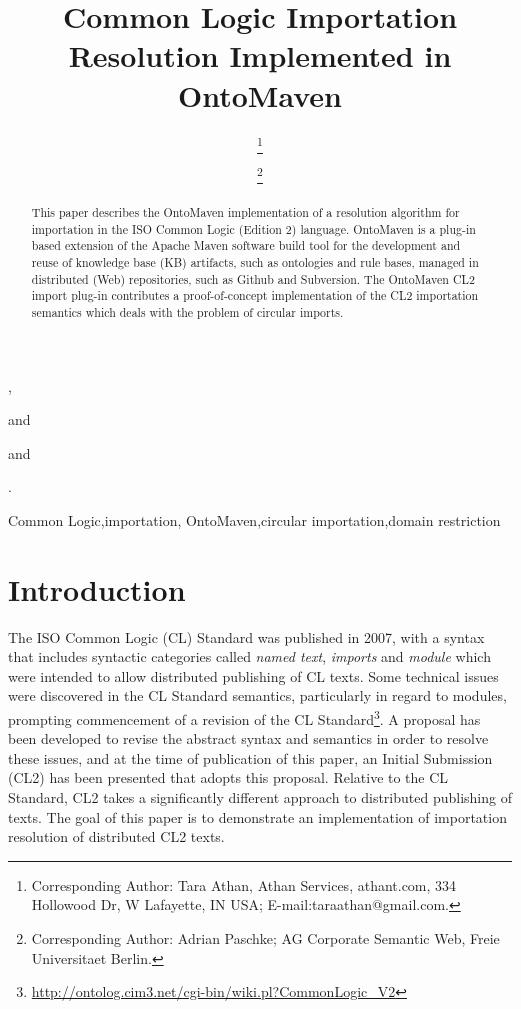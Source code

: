 \documentclass{IOS-Book-Article}
\begin{document}
\newtheorem{theo}{Theorem}
\newtheorem{cor}{Corollary}
\newtheorem{lem}{Lemma}
\begin{frontmatter}              %

\title{Common Logic Importation Resolution Implemented in OntoMaven}

\author[A]{ },%
\author[B]{ 
\thanks{Corresponding Author: Tara Athan, Athan Services, athant.com, 334 Hollowood Dr, W Lafayette, IN USA; E-mail:taraathan@gmail.com.}}
and
\author[A]{ 
\thanks{Corresponding Author: Adrian Paschke; AG Corporate Semantic Web, Freie Universitaet Berlin.}}
\address[A]{Freie Universitaet Berlin, Germany} and
\address[B]{Athan Services, USA}.

\begin{abstract}
This paper describes the OntoMaven implementation of a resolution algorithm for importation in the ISO Common Logic (Edition 2) language. OntoMaven is a plug-in based extension of the Apache Maven software build tool for the development and reuse of knowledge base (KB) artifacts, such as ontologies and rule bases, managed in distributed (Web) repositories, such as Github and Subversion. The OntoMaven CL2 import plug-in contributes a proof-of-concept implementation of the CL2 importation semantics which deals with the problem of circular imports.
\end{abstract}

\begin{keyword}
Common Logic\sep importation\sep
OntoMaven\sep circular importation\sep domain restriction
\end{keyword}
\end{frontmatter}

\thispagestyle{empty}
\pagestyle{empty}

\section*{Introduction}
\label{intro}
The ISO Common Logic (CL) Standard\cite{CL2007} was published in 2007, with a syntax that includes syntactic categories called \emph{named text}, \emph{imports} and \emph{module} which were intended to allow distributed publishing of CL texts.
Some technical issues were discovered\cite{horatio2012} in the CL Standard semantics, particularly in regard to modules, 
prompting commencement of a revision of the CL Standard\footnote{\url{http://ontolog.cim3.net/cgi-bin/wiki.pl?CommonLogic_V2}}.
A proposal has been developed\cite{AthanNeuhaus} to revise the abstract syntax and semantics in order to 
resolve these issues, and at the time of publication of this paper, 
an Initial Submission\cite{CDv2} (CL2) has been presented that adopts this proposal. 
Relative to the CL Standard, CL2 takes a significantly different approach to distributed publishing of texts.
The goal of this paper is to demonstrate an implementation of importation resolution of distributed CL2 texts.
\end{document}
